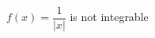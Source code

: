 \documentclass[preview]{standalone}
\begin{document}
\begin{center}
$f(x) = \dfrac{1}{|x|}$ is not integrable
\end{center}
\end{document}
